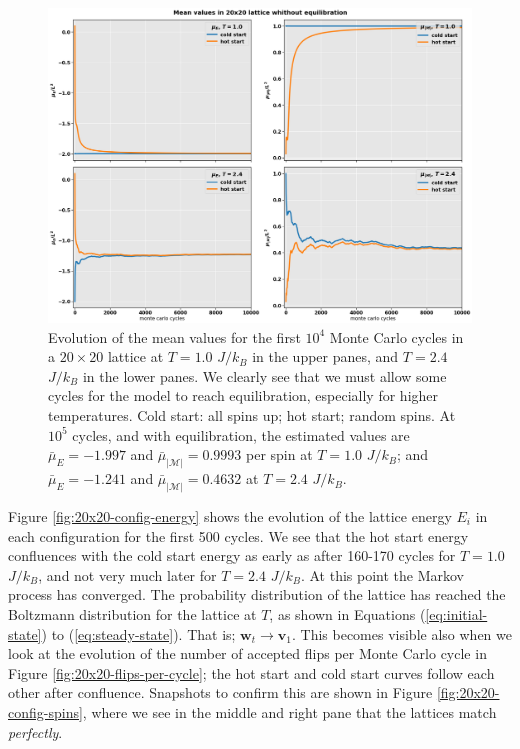 \documentclass[]{article}
\begin{document}
\begin{figure}[!h]
	\centering
	\includegraphics[width=1\linewidth]{./figs/20x20-wo-equilibration.png}
	\caption{Evolution of the mean values for the first $10^4$ Monte Carlo cycles in a $20 \times 20$ lattice at $T = 1.0$ $J/k_B$ in the upper panes, and $T = 2.4$ $J/k_B$ in the lower panes. We clearly see that we must allow some cycles for the model to reach equilibration, especially for higher temperatures. Cold start: all spins up; hot start; random spins. At $10^5$ cycles, and with equilibration, the estimated values are $\bar{\mu}_E = -1.997$ and $\bar{\mu}_{|\mathcal{M}|} = 0.9993$ per spin at $T = 1.0$ $J/k_B$; and $\bar{\mu}_E = -1.241$ and $\bar{\mu}_{|\mathcal{M}|} = 0.4632$ at $T = 2.4$ $J/k_B$.}
	\label{fig:20x20-wo-equilibration}
\end{figure}

Figure \ref{fig:20x20-config-energy} shows the evolution of the lattice energy $E_i$ in each configuration for the first 500 cycles. We see that the hot start energy confluences with the cold start energy as early as after 160-170 cycles for $T = 1.0$ $J/k_B$, and not very much later for $T = 2.4$ $J/k_B$. At this point the Markov process has converged. The probability distribution of the lattice has reached the Boltzmann distribution for the lattice at $T$, as shown in Equations (\ref{eq:initial-state}) to (\ref{eq:steady-state}). That is; $\mathbf{w}_t \rightarrow \mathbf{v}_1$. This becomes visible also when we look at the evolution of the number of accepted flips per Monte Carlo cycle in Figure \ref{fig:20x20-flips-per-cycle}; the hot start and cold start curves follow each other after confluence. Snapshots to confirm this are shown in Figure \ref{fig:20x20-config-spins}, where we see in the middle and right pane that the lattices match \textit{perfectly}. 
\end{document}
